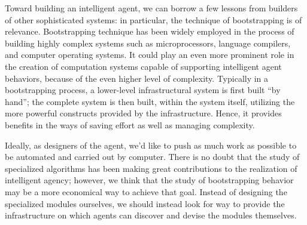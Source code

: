 \documentclass[]{llncs}
\begin{document}
Toward building an intelligent agent, we can borrow a few lessons from
builders of other sophisticated systems: in particular, the technique of
bootstrapping is of relevance.  Bootstrapping technique has been widely
employed in the process of building highly complex systems such as
microprocessors, language compilers, and computer operating systems.  It
could play an even more prominent role in the creation of computation
systems capable of supporting intelligent agent behaviors, because of the
even higher level of complexity.  Typically in a bootstrapping process, a
lower-level infrastructural system is first built ``by hand''; the complete
system is then built, within the system itself, utilizing the more powerful
constructs provided by the infrastructure.  Hence, it provides benefits in
the ways of saving effort as well as managing complexity.

Ideally, as designers of the agent, we'd like to push as much work as
possible to be automated and carried out by computer.  There is no doubt
that the study of specialized algorithms has been making great
contributions to the realization of intelligent agency; however, we think
that the study of bootstrapping behavior may be a more economical way to
achieve that goal.  Instead of designing the specialized modules ourselves,
we should instead look for way to provide the infrastructure on which
agents can discover and devise the modules themselves.

\end{document}
